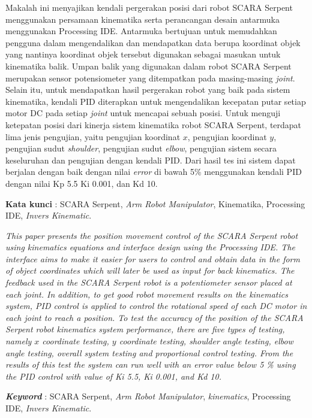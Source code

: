 \documentclass{DTEDI_KP}
\begin{document}
\tableofcontents
{}
\listoftables
{}
\listoffigures
{}

\begin{abstractind}
	Makalah ini menyajikan kendali pergerakan posisi dari robot SCARA Serpent menggunakan persamaan kinematika serta perancangan desain antarmuka menggunakan Processing IDE. Antarmuka bertujuan untuk memudahkan pengguna dalam mengendalikan dan mendapatkan data berupa koordinat objek yang nantinya koordinat objek tersebut digunakan sebagai masukan untuk kinematika balik. Umpan balik yang digunakan dalam robot SCARA Serpent merupakan sensor potensiometer yang ditempatkan pada masing-masing \textit{joint}. Selain itu, untuk mendapatkan hasil pergerakan robot yang baik pada sistem kinematika, kendali PID diterapkan untuk mengendalikan kecepatan putar setiap motor DC pada setiap \textit{joint} untuk mencapai sebuah posisi. Untuk menguji ketepatan posisi dari kinerja sistem kinematika robot SCARA Serpent, terdapat lima jenis pengujian, yaitu pengujian koordinat $x$, pengujian koordinat $y$, pengujian sudut \textit{shoulder}, pengujian sudut \textit{elbow}, pengujian sistem secara keseluruhan dan pengujian dengan kendali PID. Dari hasil tes ini sistem dapat berjalan dengan baik dengan nilai \textit{error} di bawah 5\% menggunakan kendali PID dengan nilai Kp 5.5 Ki 0.001, dan Kd 10.
	
	
	\textbf{Kata kunci }: SCARA Serpent, \textit{Arm Robot Manipulator}, Kinematika, Processing IDE, \textit{Invers Kinematic}.
\end{abstractind}

\begin{abstracteng}
	\textit{This paper presents the position movement control of the SCARA Serpent robot using kinematics equations and interface design using the Processing IDE. The interface aims to make it easier for users to control and obtain data in the form of object coordinates which will later be used as input for back kinematics. The feedback used in the SCARA Serpent robot is a potentiometer sensor placed at each joint. In addition, to get good robot movement results on the kinematics system, PID control is applied to control the rotational speed of each DC motor in each joint to reach a position. To test the accuracy of the position of the SCARA Serpent robot kinematics system performance, there are five types of testing, namely $x$ coordinate testing, $y$ coordinate testing, shoulder angle testing, elbow angle testing, overall system testing and proportional control testing. From the results of this test the system can run well with an error value below 5 \% using the PID control with value of Ki 5.5, Ki 0.001, and Kd 10.}
	
	
	\textit{\textbf{Keyword}} : SCARA Serpent, \textit{Arm Robot Manipulator}, \textit{kinematics}, Processing IDE, \textit{Invers Kinematic}.
\end{abstracteng}

\newpage
\setcounter{page}{1}








\end{document}
